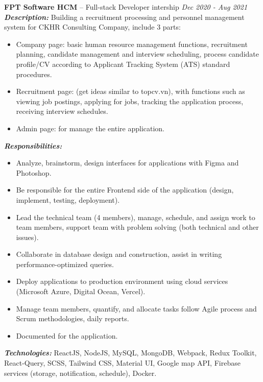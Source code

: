 \documentclass{resume}
\begin{document}
    \hspace{2cm}\textbf{\textbullet{} FPT Software HCM } {– Full-stack Developer intership} \hfill \textit{Dec 2020 - Aug 2021} \\
    \textbf{\textit{Description:}} Building a recruitment processing and personnel management system for CKHR Consulting Company, include 3 parts: 
        \begin{itemize}[label={-}, leftmargin=1cm, itemsep=-0.2em]
            \item Company page: basic human resource management functions, recruitment planning, candidate management and interview scheduling, process candidate profile/CV according to Applicant Tracking System (ATS) standard procedures.
            \item Recruitment page: (get ideas similar to topcv.vn), with functions such as viewing job postings, applying for jobs, tracking the application process, receiving interview schedules.
            \item Admin page: for manage the entire application.
        \end{itemize}
        \textbf{\textit{Responsibilities:}}
            \begin{itemize}[label={-}, leftmargin=1cm, itemsep=-0.2em]
                \item Analyze, brainstorm, design interfaces for applications with Figma and Photoshop.
                \item Be responsible for the entire Frontend side of the application (design, implement, testing, deployment).
                \item Lead the technical team (4 members), manage, schedule, and assign work to team members, support team with problem solving (both technical and other issues).
                \item Collaborate in database design and construction, assist in writing performance-optimized queries.
                \item Deploy applications to production environment using cloud services (Microsoft Azure, Digital Ocean, Vercel).
                \item Manage team members, quantify, and allocate tasks follow Agile process and Scrum methodologies, daily reports.
                \item Documented for the application.
            \end{itemize}
        \textbf{\textit{Technologies:}} ReactJS, NodeJS, MySQL, MongoDB, Webpack, Redux Toolkit, React-Query, SCSS, Tailwind CSS, Material UI, Google map API, Firebase services (storage, notification, schedule), Docker.
\end{document}
